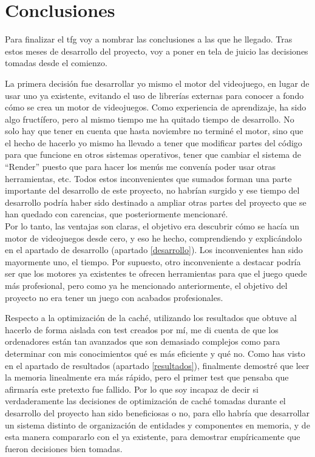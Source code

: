 
\chapter{Conclusiones}
\label{conclusiones}

Para finalizar el \gls{tfg} voy a nombrar las conclusiones a las que he llegado. Tras estos meses de desarrollo del proyecto, voy a poner en tela de juicio las decisiones tomadas desde el comienzo. 

La primera decisión fue desarrollar yo mismo el motor del videojuego, en lugar de usar uno ya existente, evitando el uso de librerías externas para conocer a fondo cómo se crea un motor de videojuegos. Como experiencia de aprendizaje, ha sido algo fructífero, pero al mismo tiempo me ha quitado tiempo de desarrollo. No solo hay que tener en cuenta que hasta noviembre no terminé el motor, sino que el hecho de hacerlo yo mismo ha llevado a tener que modificar partes del código para que funcione en otros sistemas operativos, tener que cambiar el sistema de ``Render'' puesto que para hacer los menús me convenía poder usar otras herramientas, etc. Todos estos inconvenientes que sumados forman una parte importante del desarrollo de este proyecto, no habrían surgido y ese tiempo del desarrollo podría haber sido destinado a ampliar otras partes del proyecto que se han quedado con carencias, que posteriormente mencionaré.
\\
Por lo tanto, las ventajas son claras, el objetivo era descubrir cómo se hacía un motor de videojuegos desde cero, y eso he hecho, comprendiendo y explicándolo en el apartado de desarrollo (apartado \ref{desarrollo}). Los inconvenientes han sido mayormente uno, el tiempo. Por supuesto, otro inconveniente a destacar podría ser que los motores ya existentes te ofrecen herramientas para que el juego quede más profesional, pero como ya he mencionado anteriormente, el objetivo del proyecto no era tener un juego con acabados profesionales.

Respecto a la optimización de la caché, utilizando los resultados que obtuve al hacerlo de forma aislada con test creados por mí, me di cuenta de que los ordenadores están tan avanzados que son demasiado complejos como para determinar con mis conocimientos qué es más eficiente y qué no. Como has visto en el apartado de resultados (apartado \ref{resultados}), finalmente demostré que leer la memoria linealmente era más rápido, pero el primer test que pensaba que afirmaría este pretexto fue fallido. Por lo que soy incapaz de decir si verdaderamente las decisiones de optimización de caché tomadas durante el desarrollo del proyecto han sido beneficiosas o no, para ello habría que desarrollar un sistema distinto de organización de entidades y componentes en memoria, y de esta manera compararlo con el ya existente, para demostrar empíricamente que fueron decisiones bien tomadas.

